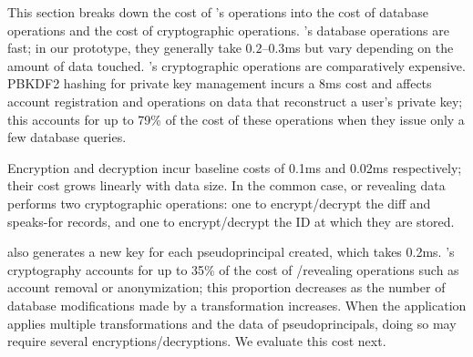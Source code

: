 This section breaks down the cost of \sys's operations into the cost of database
operations and the cost of cryptographic operations.
%
%
%
%
\sys's database operations are fast; in our prototype, they generally take
$0.2$--$0.3$ms but vary depending on the amount of data touched.
%
%
\sys's cryptographic operations are comparatively expensive.
%
PBKDF2 hashing for private key management incurs a 8ms cost and affects account
registration and operations on \xxed data that reconstruct a user's private key;
this accounts for up to 79\% of the cost of these operations when they issue
only a few database queries.
%
%
%

Encryption and decryption incur baseline costs of 0.1ms and 0.02ms respectively;
their cost grows linearly with data size.
%
In the common case, \xxing or revealing data performs two cryptographic
operations: one to encrypt/decrypt the diff and speaks-for records, and one to
encrypt/decrypt the ID at which they are stored.
%

\sys also generates a new key for each pseudoprincipal created, which takes
0.2ms.
\sys's cryptography accounts for up to 35\%
of the cost of \xxing/revealing operations such as account removal or
anonymization; this proportion decreases as the number of database
modifications made by a transformation increases.
%
When the application applies multiple \xxing transformations and \xxs the
data of pseudoprincipals, doing so may require several encryptions/decryptions.
%
We evaluate this cost next.
%

